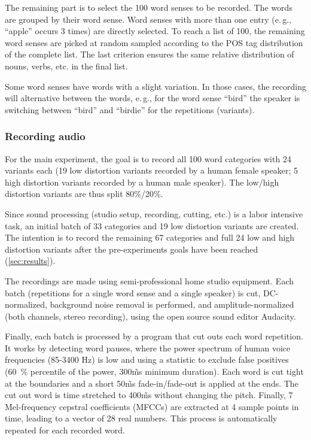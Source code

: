 \documentclass[twocolumn]{article}
\begin{document}
The remaining part is to select the 100 word senses to be recorded. The words are grouped by their word sense. Word senses with more than one entry (e.\,g., \enquote{apple} occurs 3 times) are directly selected. To reach a list of 100, the remaining word senses are picked at random sampled according to the POS tag distribution of the complete list. The last criterion ensures the same relative distribution of nouns, verbs, etc. in the final list.

Some word senses have words with a slight variation. In those cases, the recording will alternative between the words, e.\,g., for the word sense \enquote{bird} the speaker is switching between \enquote{bird} and \enquote{birdie} for the repetitions (variants).

\subsubsection{Recording audio} \label{sub:recording-audio}
For the main experiment, the goal is to record all 100 word categories with 24 variants each (19 low distortion variants recorded by a human female speaker; 5 high distortion variants recorded by a human male speaker). The low/high distortion variants are thus split 80\%/20\%.

Since sound processing (studio setup, recording, cutting, etc.) is a labor intensive task, an initial batch of 33 categories and 19 low distortion variants are created. The intention is to record the remaining 67 categories and full 24 low and high distortion variants after the pre-experiments goals have been reached (\autoref{sec:results}).

The recordings are made using semi-professional home studio equipment. Each batch (repetitions for a single word sense and a single speaker) is cut, DC-normalized, background noise removal is performed, and amplitude-normalized (both channels, stereo recording), using the open source sound editor Audacity.

Finally, each batch is processed by a program that cut outs each word repetition. It works by detecting word pauses, where the power spectrum of human voice frequencies (85-3400 Hz) is low and using a statistic to exclude false positives (60~\% percentile of the power, 300\~ms minimum duration). Each word is cut tight at the boundaries and a short 50\~ms fade-in/fade-out is applied at the ends. The cut out word is time stretched to 400\~ms without changing the pitch. Finally, 7 Mel-frequency cepstral coefficients (MFCCs) are extracted at 4 sample points in time, leading to a vector of 28 real numbers. This process is automatically repeated for each recorded word.
\end{document}
